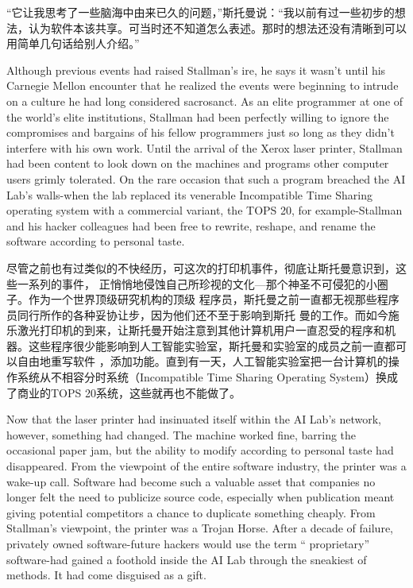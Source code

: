 \ifdefined\chs
``它让我思考了一些脑海中由来已久的问题，''斯托曼说：``我以前有过一些初步的想法，认为软件本该共享。可当时还不知道怎么表述。那时的想法还没有清晰到可以用简单几句话给别人介绍。''
\fi

\ifdefined\eng
Although previous events had raised Stallman's ire, he says it wasn't until his
Carnegie Mellon encounter that he realized the events were beginning to intrude
on a culture he had long considered sacrosanct. As an elite programmer at one of
the world's elite institutions, Stallman had been perfectly willing to ignore
the compromises and bargains of his fellow programmers just so long as they
didn't interfere with his own work. Until the arrival of the Xerox laser
printer, Stallman had been content to look down on the machines and programs
other computer users grimly tolerated. On the rare occasion that such a program
breached the AI Lab's walls-when the lab replaced its venerable Incompatible
Time Sharing operating system with a commercial variant, the TOPS 20, for
example-Stallman and his hacker colleagues had been free to rewrite, reshape,
and rename the software according to personal taste.
\fi

\ifdefined\chs
尽管之前也有过类似的不快经历，可这次的打印机事件，彻底让斯托曼意识到，这些一系列的事件，
正悄悄地侵蚀自己所珍视的文化---那个神圣不可侵犯的小圈子。作为一个世界顶级研究机构的顶级
程序员，斯托曼之前一直都无视那些程序员同行所作的各种妥协让步，因为他们还不至于影响到斯托
曼的工作。而如今施乐激光打印机的到来，让斯托曼开始注意到其他计算机用户一直忍受的程序和机
器。这些程序很少能影响到人工智能实验室，斯托曼和实验室的成员之前一直都可以自由地重写软件
，添加功能。直到有一天，人工智能实验室把一台计算机的操作系统从不相容分时系统（Incompatible
Time Sharing Operating System）换成了商业的TOPS 20系统，这些就再也不能做了。
\fi

\ifdefined\eng
Now that the laser printer had insinuated itself within the AI Lab's network,
however, something had changed. The machine worked fine, barring the occasional
paper jam, but the ability to modify according to personal taste had
disappeared. From the viewpoint of the entire software industry, the printer was
a wake-up call. Software had become such a valuable asset that companies no
longer felt the need to publicize source code, especially when publication meant
giving potential competitors a chance to duplicate something cheaply. From
Stallman's viewpoint, the printer was a Trojan Horse. After a decade of failure,
privately owned software-future hackers would use the term `` proprietary''
software-had gained a foothold inside the AI Lab through the sneakiest of
methods. It had come disguised as a gift.
\fi

